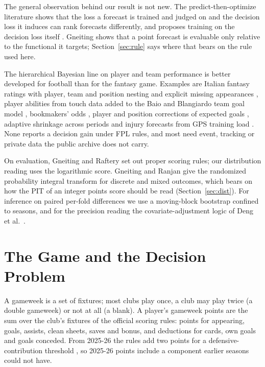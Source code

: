 \documentclass[11pt,a4paper]{article}
\begin{document}
The general observation behind our result is not new. The predict-then-optimize literature shows that the loss a forecast is trained and judged on and the decision loss it induces can rank forecasts differently, and proposes training on the decision loss itself \cite{elmachtoub2022}. Gneiting \cite{gneiting2011} shows that a point forecast is evaluable only relative to the functional it targets; Section~\ref{sec:rule} says where that bears on the rule used here.

The hierarchical Bayesian line on player and team performance is better developed for football than for the fantasy game. Examples are Italian fantasy ratings with player, team and position nesting and explicit missing appearances \cite{egidi2018}, player abilities from touch data added to the Baio and Blangiardo \cite{baio2010} team goal model \cite{whitaker2020}, bookmakers' odds \cite{egidi2018b}, player and position corrections of expected goals \cite{scholtes2024}, adaptive shrinkage across periods \cite{macridemartino2025} and injury forecasts from GPS training load \cite{rossi2018}. None reports a decision gain under FPL rules, and most need event, tracking or private data the public archive does not carry.

On evaluation, Gneiting and Raftery \cite{gneiting2007} set out proper scoring rules; our distribution reading uses the logarithmic score. Gneiting and Ranjan \cite{gneitingranjan2013} give the randomized probability integral transform for discrete and mixed outcomes, which bears on how the PIT of an integer points score should be read (Section~\ref{sec:dist}). For inference on paired per-fold differences we use a moving-block bootstrap \cite{kunsch1989} confined to seasons, and for the precision reading the covariate-adjustment logic of Deng et al.\ \cite{deng2013}.

\section{The Game and the Decision Problem}
\label{sec:game}

A gameweek is a set of fixtures; most clubs play once, a club may play twice (a double gameweek) or not at all (a blank). A player's gameweek points are the sum over the club's fixtures of the official scoring rules: points for appearing, goals, assists, clean sheets, saves and bonus, and deductions for cards, own goals and goals conceded. From 2025-26 the rules add two points for a defensive-contribution threshold \cite{plglossary}, so 2025-26 points include a component earlier seasons could not have.
\end{document}
